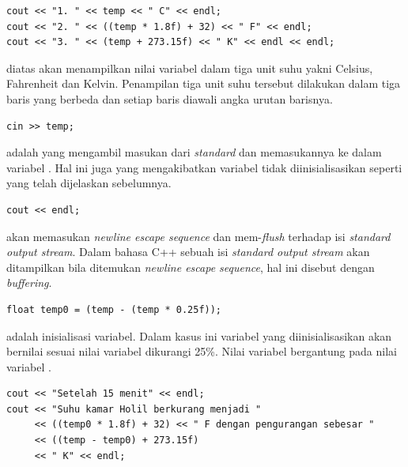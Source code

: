 \documentclass[../main.tex]{subfiles}
\begin{document}
\begin{lstlisting}
cout << "1. " << temp << " C" << endl;
cout << "2. " << ((temp * 1.8f) + 32) << " F" << endl;
cout << "3. " << (temp + 273.15f) << " K" << endl << endl;
\end{lstlisting}

    \ilz{}{\Script} diatas akan menampilkan nilai variabel  dalam tiga unit suhu yakni Celsius, Fahrenheit dan Kelvin. Penampilan tiga unit suhu tersebut dilakukan dalam tiga baris yang berbeda dan setiap baris diawali angka urutan barisnya.

\begin{lstlisting}
cin >> temp;
\end{lstlisting}

    \ilz{}{\Script}  adalah {\statement} {\ioi} yang mengambil masukan dari \textit{standard} {\ioi} {\stream} dan memasukannya ke dalam variabel . Hal ini juga yang mengakibatkan variabel  tidak diinisialisasikan seperti yang telah dijelaskan sebelumnya.

\begin{lstlisting}
cout << endl;
\end{lstlisting}

    \ilz{}{\Script}  akan memasukan \textit{newline escape sequence} dan mem-\textit{flush} terhadap isi \textit{standard output stream}. Dalam bahasa C++ sebuah isi \textit{standard output stream} akan ditampilkan bila ditemukan \textit{newline escape sequence}, hal ini disebut dengan \textit{buffering}.

\begin{lstlisting}
float temp0 = (temp - (temp * 0.25f));
\end{lstlisting}

    \ilz{}{\Script}  adalah {\statement} inisialisasi variabel. Dalam kasus ini variabel yang diinisialisasikan akan bernilai sesuai nilai variabel  dikurangi 25\%. Nilai variabel  bergantung pada nilai variabel .

\begin{lstlisting}
cout << "Setelah 15 menit" << endl;
cout << "Suhu kamar Holil berkurang menjadi "
     << ((temp0 * 1.8f) + 32) << " F dengan pengurangan sebesar "
     << ((temp - temp0) + 273.15f)
     << " K" << endl;
\end{lstlisting}
\end{document}
